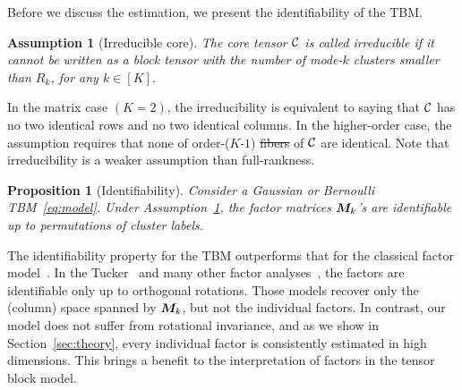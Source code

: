 \documentclass[11pt]{article}
\theoremstyle{plain}
\newtheorem{prop}{Proposition}
\newtheorem{ass}{Assumption}
\theoremstyle{definition}
\providecommand{\DIFaddtex}[1]{{\protect\color{blue}\uwave{#1}}} %
\providecommand{\DIFdeltex}[1]{{\protect\color{red}\sout{#1}}}                      %
\providecommand{\DIFaddbegin}{} %
\providecommand{\DIFaddend}{} %
\providecommand{\DIFdelbegin}{} %
\providecommand{\DIFdelend}{} %
\providecommand{\DIFadd}[1]{\texorpdfstring{\DIFaddtex{#1}}{#1}} %
\providecommand{\DIFdel}[1]{\texorpdfstring{\DIFdeltex{#1}}{}} %
\begin{document}
Before we discuss the estimation, we present the identifiability of the TBM. 
\DIFaddbegin \vspace{-.1cm}
\DIFaddend \begin{ass}[Irreducible core]\label{ass:core}
The core tensor $\mathcal{C}$ is called irreducible if it cannot be written as a block tensor with the number of mode-$k$ clusters smaller than $R_k$, for any $k\in[K]$. 
\end{ass}
\DIFdelbegin %

\DIFdelend \DIFaddbegin \vspace{-.1cm}
\DIFaddend In the matrix case $(K=2)$, the irreducibility is equivalent to saying that $\mathcal{C}$ has no two identical rows and no two identical columns. In the higher-order case, the assumption requires that none of order-($K$-$1$) \DIFdelbegin \DIFdel{fibers }\DIFdelend \DIFaddbegin \DIFadd{slices }\DIFaddend of $\mathcal{C}$ are identical. Note that irreducibility is a weaker assumption than full-rankness. 
\DIFdelbegin %

\DIFdelend \DIFaddbegin \vspace{-.4cm}
\DIFaddend \begin{prop}[Identifiability]\label{prop:factors}
Consider a Gaussian or Bernoulli TBM~\eqref{eq:model}. Under Assumption~\ref{ass:core}, the factor matrices $\bm M_k$'s are identifiable up to permutations of cluster labels. 
\end{prop}
\DIFdelbegin %

\DIFdelend \DIFaddbegin \vspace{-.1cm}
\DIFaddend The identifiability property for the TBM outperforms that for the classical factor model~\cite{darton1980rotation,abdi2003factor}. In the Tucker~\cite{zhang2018tensor,kolda2009tensor} and many other factor analyses~\cite{darton1980rotation,abdi2003factor}, the factors are identifiable only up to orthogonal rotations. Those models recover only the (column) space spanned by $\bm M_k$, but not the individual factors. In contrast, our model does not suffer from rotational invariance, and as we show in Section~\ref{sec:theory}, every individual factor is consistently estimated in high dimensions. This brings a benefit to the interpretation of factors in the tensor block model.  
\end{document}
